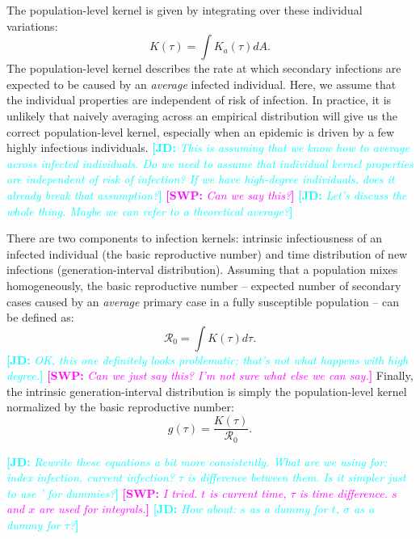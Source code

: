 \documentclass[12pt]{article}
\newcommand{\RR}{\ensuremath{{\mathcal R}}}
\newcommand{\comment}[3]{\textcolor{#1}{\textbf{[#2: }\textsl{#3}\textbf{]}}}
\newcommand{\jd}[1]{\comment{cyan}{JD}{#1}}
\newcommand{\swp}[1]{\comment{magenta}{SWP}{#1}}
\begin{document}
The population-level kernel is given by integrating over these individual variations:
\begin{equation}
K(\tau) = \int K_a (\tau) dA.
\end{equation}
The population-level kernel describes the rate at which secondary infections are expected to be caused by an \emph{average} infected individual.
Here, we assume that the individual properties are independent of risk of infection.
In practice, it is unlikely that naively averaging across an empirical distribution will give us the correct population-level kernel, especially when an epidemic is driven by a few highly infectious individuals.
\jd{This is assuming that we know how to average across infected individuals. Do we need to assume that individual kernel properties are independent of risk of infection? If we have high-degree individuals, does it already break that assumption?}
\swp{Can we say this?}
\jd{Let's discuss the whole thing. Maybe we can refer to a theoretical average?}

There are two components to infection kernels: intrinsic infectiousness of an infected individual (the basic reproductive number) and time distribution of new infections (generation-interval distribution).
Assuming that a population mixes homogeneously, the basic reproductive number -- expected number of secondary cases caused by an \emph{average} primary case in a fully susceptible population -- can be defined as: 
\begin{equation}
\RR_0 = \int K(\tau) d\tau.
\end{equation}
\jd{OK, this one definitely looks problematic; that's not what happens with high degree.}
\swp{Can we just say this? I'm not sure what else we can say.}
Finally, the intrinsic generation-interval distribution is simply the population-level kernel normalized by the basic reproductive number:
\begin{equation}
g(\tau) = \frac{K(\tau)}{\RR_0}.
\end{equation}

\jd{Rewrite these equations a bit more consistently. What are we using for: index infection, current infection? $\tau$ is difference between them. Is it simpler just to use ' for dummies?}
\swp{I tried. $t$ is current time, $\tau$ is time difference. $s$ and $x$ are used for integrals.}
\jd{How about: $s$ as a dummy for $t$, $\sigma$ as a dummy for $\tau$?}
\end{document}
